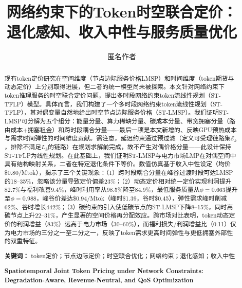 \documentclass[11pt,a4paper,twocolumn]{article}
\title{\textbf{网络约束下的Token时空联合定价：\\退化感知、收入中性与服务质量优化}}
\author{
  匿名作者
}
\date{}
\begin{document}
\maketitle

\begin{abstract}

现有token定价研究在空间维度（节点边际服务价格LMSP）和时间维度（token期货与动态定价）上分别取得进展，但二者的统一模型尚未被探索。本文针对网络约束下token推理服务的时空联合定价问题，提出多时段网络约束token流线性规划（ST-TFLP）模型。具体而言，我们构建了一个多时段网络约束token流线性规划（ST-TFLP），其对偶变量自然地给出时空节点边际服务价格（ST-LMSP）。我们证明ST-LMSP可分解为五个组分：能量分量、算力稀缺分量、碳成本分量、带宽拥塞分量（路由成本+拥塞租金）和跨时段耦合分量——最后一项是本文新增的、反映GPU预热成本与需求时间弹性的时间维度贡献。需注意，延迟约束通过预过滤（定义可受理链路集$\mathcal{E}_k$，排除不满足$L_k$的链路）在规划求解前完成，故不产生对偶价格分量——此设计保持ST-TFLP为线性规划。在此基础上，我们证明ST-LMSP与电力市场LMP在对偶空间中具有结构映射关系，二者在特定退化条件下等价。数值仿真基于收入中性设定（均价\$0.80/Mtok），揭示了三个关键现象：（1）跨时段耦合分量在峰谷过渡时段可达LMSP的18--35\%，忽略该分量导致定价偏差23\%；（2）动态定价相对统一定价实现利润提升82.7\%与福利改善9.4\%，峰时利用率从98.5\%降至84.9\%，最低服务质量从$\phi{=}0.663$提升至$\phi{=}0.988$，峰谷价差达\$0.94/Mtok（峰时\$1.39，谷时\$0.45），弹性需求峰时削减62\%、谷时增长442\%；（3）碳约束的引入使低碳节点的ST-LMSP下降8--15\%，同时高碳节点上升22--31\%，产生显著的空间价格再分配效应。跨市场对比表明，token动态定价的利润增益（83\%）远高于电力市场（30--60\%），而福利损失/利润增益比（0.11）仅为电力市场的三分之一至二分之一，反映了token需求更高时间弹性与更低拥塞外部性的双重特征。

\textbf{关键词：} token定价；节点边际定价；时空联合优化；网络约束；退化感知；收入中性

\vspace{6pt}
\noindent\textbf{\large Spatiotemporal Joint Token Pricing under Network Constraints: \\ Degradation-Aware, Revenue-Neutral, and QoS Optimization}


\end{abstract}
\end{document}
